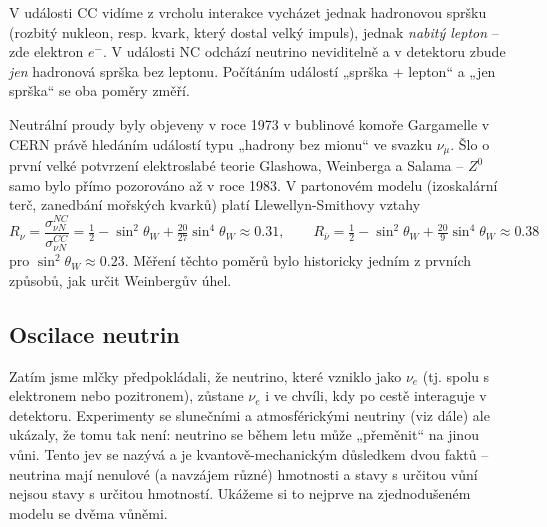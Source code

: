 V události CC vidíme z vrcholu interakce vycházet jednak hadronovou spršku (rozbitý nukleon, resp. kvark, který dostal velký impuls), jednak \emph{nabitý lepton} -- zde elektron \(e^-\). V události NC odchází neutrino neviditelně a v detektoru zbude \emph{jen} hadronová sprška bez leptonu. Počítáním událostí „sprška + lepton“ a „jen sprška“ se oba poměry změří.

\begin{vysvetleni}
Neutrální proudy byly objeveny v roce 1973 v bublinové komoře Gargamelle v CERN právě hledáním událostí typu „hadrony bez mionu“ ve svazku \(\nu_\mu\). Šlo o první velké potvrzení elektroslabé teorie Glashowa, Weinberga a Salama -- \(Z^0\) samo bylo přímo pozorováno až v roce 1983. V partonovém modelu (izoskalární terč, zanedbání mořských kvarků) platí Llewellyn-Smithovy vztahy
\[
  R_\nu=\frac{\sigma^{NC}_{\nu N}}{\sigma^{CC}_{\nu N}}=\tfrac12-\sin^2\theta_W+\tfrac{20}{27}\sin^4\theta_W\approx 0.31,\qquad
  R_{\bar\nu}=\tfrac12-\sin^2\theta_W+\tfrac{20}{9}\sin^4\theta_W\approx 0.38
\]
pro \(\sin^2\theta_W\approx0.23\). Měření těchto poměrů bylo historicky jedním z prvních způsobů, jak určit Weinbergův úhel.
\end{vysvetleni}

\subsection{Oscilace neutrin}

Zatím jsme mlčky předpokládali, že neutrino, které vzniklo jako \(\nu_e\) (tj. spolu s elektronem nebo pozitronem), zůstane \(\nu_e\) i ve chvíli, kdy po cestě interaguje v detektoru. Experimenty se slunečními a atmosférickými neutriny (viz dále) ale ukázaly, že tomu tak není: neutrino se během letu může „přeměnit“ na jinou vůni. Tento jev se nazývá  a je kvantově-mechanickým důsledkem dvou faktů -- neutrina mají nenulové (a navzájem různé) hmotnosti a stavy s určitou vůní nejsou stavy s určitou hmotností. Ukážeme si to nejprve na zjednodušeném modelu se dvěma vůněmi.

